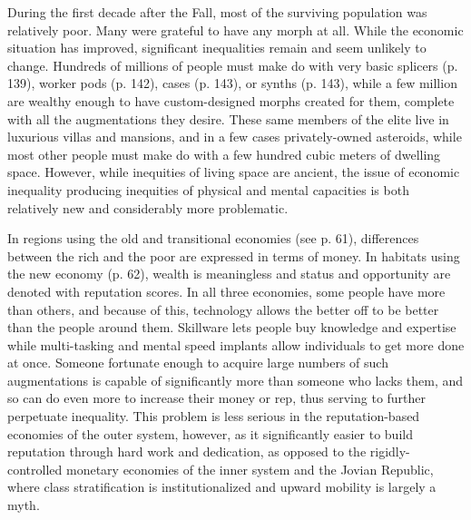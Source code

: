 During the first decade after the Fall, 
most of the surviving population was 
relatively poor. Many were grateful to 
have any morph at all. While the economic
situation has improved, significant
inequalities remain and seem unlikely to 
change. Hundreds of millions of people 
must make do with very basic splicers (p. 
139), worker pods (p. 142), cases (p. 143), 
or synths (p. 143), while a few million are 
wealthy enough to have custom-designed 
morphs created for them, complete with 
all the augmentations they desire. These 
same members of the elite live in luxurious
villas and mansions, and in a few
cases privately-owned asteroids, while 
most other people must make do with 
a few hundred cubic meters of dwelling 
space. However, while inequities of living 
space are ancient, the issue of economic 
inequality producing inequities of physical
and mental capacities is both relatively
new and considerably more problematic.

In regions using the old and transitional
economies (see p. 61), differences
between the rich and the poor are expressed
in terms of money. In habitats
using the new economy (p. 62), wealth is 
meaningless and status and opportunity 
are denoted with reputation scores. In all 
three economies, some people have more 
than others, and because of this, technology
allows the better off to be better
than the people around them. Skillware 
lets people buy knowledge and expertise
while multi-tasking and mental
speed implants allow individuals to get 
more done at once. Someone fortunate 
enough to acquire large numbers of such 
augmentations is capable of significantly 
more than someone who lacks them, and 
so can do even more to increase their 
money or rep, thus serving to further 
perpetuate inequality. This problem is 
less serious in the reputation-based economies
of the outer system, however, as
it significantly easier to build reputation 
through hard work and dedication, as 
opposed to the rigidly-controlled monetary
economies of the inner system and
the Jovian Republic, where class stratification
is institutionalized and upward
mobility is largely a myth.

